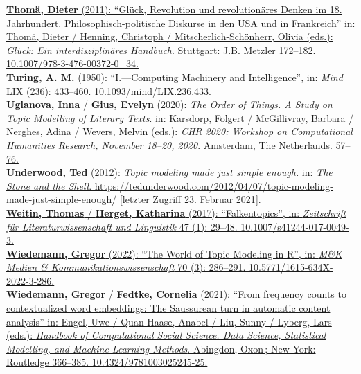 \documentclass[
  12pt,
  letterpaper,
  DIV=11,
  numbers=noendperiod]{scrreprt}
\begin{document}
\href{https://www.zotero.org/google-docs/?fqBRoB}{\textbf{Thomä, Dieter}
(2011): ``Glück, Revolution und revolutionäres Denken im 18.
Jahrhundert. Philosophisch-politische Diskurse in den USA und in
Frankreich'' in: Thomä, Dieter / Henning, Christoph /
Mitscherlich-Schönherr, Olivia (eds.): \emph{Glück: Ein
interdisziplinäres Handbuch}. Stuttgart: J.B. Metzler 172--182.
10.1007/978-3-476-00372-0\_34.}\\
\href{https://www.zotero.org/google-docs/?fqBRoB}{\textbf{Turing, A. M.}
(1950): ``I.---Computing Machinery and Intelligence'', in: \emph{Mind}
LIX (236): 433--460. 10.1093/mind/LIX.236.433.}\\
\href{https://www.zotero.org/google-docs/?fqBRoB}{\textbf{Uglanova,
Inna} / \textbf{Gius, Evelyn} (2020): \emph{The Order of Things. A Study
on Topic Modelling of Literary Texts}. in: Karsdorp, Folgert /
McGillivray, Barbara / Nerghes, Adina / Wevers, Melvin (eds.): \emph{CHR
2020: Workshop on Computational Humanities Research, November 18--20,
2020}. Amsterdam, The Netherlands. 57--76.}\\
\href{https://www.zotero.org/google-docs/?fqBRoB}{\textbf{Underwood,
Ted} (2012): \emph{Topic modeling made just simple enough.} in:
\emph{The Stone and the Shell}.
https://tedunderwood.com/2012/04/07/topic-modeling-made-just-simple-enough/
{[}letzter Zugriff 23. Februar 2021{]}.}\\
\href{https://www.zotero.org/google-docs/?fqBRoB}{\textbf{Weitin,
Thomas} / \textbf{Herget, Katharina} (2017): ``Falkentopics'', in:
\emph{Zeitschrift für Literaturwissenschaft und Linguistik} 47 (1):
29--48. 10.1007/s41244-017-0049-3.}\\
\href{https://www.zotero.org/google-docs/?fqBRoB}{\textbf{Wiedemann,
Gregor} (2022): ``The World of Topic Modeling in R'', in: \emph{M\&K
Medien \& Kommunikationswissenschaft} 70 (3): 286--291.
10.5771/1615-634X-2022-3-286.}\\
\href{https://www.zotero.org/google-docs/?fqBRoB}{\textbf{Wiedemann,
Gregor} / \textbf{Fedtke, Cornelia} (2021): ``From frequency counts to
contextualized word embeddings: The Saussurean turn in automatic content
analysis'' in: Engel, Uwe / Quan-Haase, Anabel / Liu, Sunny / Lyberg,
Lars (eds.): \emph{Handbook of Computational Social Science. Data
Science, Statistical Modelling, and Machine Learning Methods}. Abingdon,
Oxon\,; New York: Routledge 366--385. 10.4324/9781003025245-25.}

\section{}\label{section-4}
\end{document}
